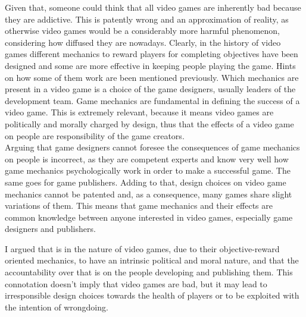 \documentclass[10pt,a4paper]{article}
\begin{document}
Given that, someone could think that all video games are inherently bad because they are addictive.
This is patently wrong and an approximation of reality, as otherwise video games would be a considerably more harmful phenomenon, considering how diffused they are nowadays.
Clearly, in the history of video games different mechanics to reward players for completing objectives have been designed and some are more effective in keeping people playing the game. 
Hints on how some of them work are been mentioned previously.
Which mechanics are present in a video game is a choice of the game designers, usually leaders of the development team.
Game mechanics are fundamental in defining the success of a video game.
This is extremely relevant, because it means video games are politically and morally charged by design, thus that the effects of a video game on people are responsibility of the game creators.\\
Arguing that game designers cannot foresee the consequences of game mechanics on people is incorrect, as they are competent experts and know very well how game mechanics psychologically work in order to make a successful game.
The same goes for game publishers.
Adding to that, design choices on video game mechanics cannot be patented and, as a consequence, many games share slight variations of them.
This means that game mechanics and their effects are common knowledge between anyone interested in video games, especially game designers and publishers.

I argued that is in the nature of video games, due to their objective-reward oriented mechanics, to have an intrinsic political and moral nature, and that the accountability over that is on the people developing and publishing them.
This connotation doesn't imply that video games are bad, but it may lead to irresponsible design choices towards the health of players or to be exploited with the intention of wrongdoing. 
\end{document}
